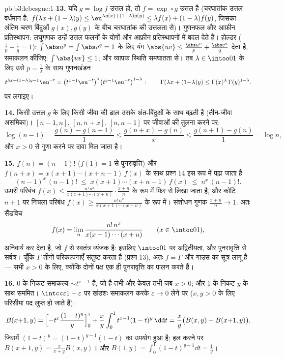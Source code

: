 \begin{solution}{pb:b3:lebesgue:1}
\textbf{13.} यदि $g = \log f$ उत्तल हो, तो $f = \exp\circ g$ उत्तल है (चरघातांक उत्तल
वर्धमान है: $f(\lambda x + (1-\lambda)
y) \leq \eu^{\lambda g(x) + (1-\lambda)g(y)} \leq \lambda f(x)
+ (1-\lambda)f(y)$, जिसका अंतिम चरण बिंदुओं $g(x), g(y)$ के बीच चरघातांक
की उत्तलता से)। गुणनफल और आफ़ीन प्रतिस्थापन: लघुगणक उन्हें उत्तल
फलनों के योगों और आफ़ीन प्रतिस्थापनों में बदल देते हैं। होल्डर ($\frac1p + \frac1q = 1$):
$\int\abs u^p = \int\abs v^q = 1$ के लिए यंग $\abs{uv} \leq
\frac{\abs u^p}p + \frac{\abs v^q}q$ देता है, समाकलन कीजिए: $\int\abs{uv}
\leq 1$; और व्यापक स्थिति
समघातता से। तब $\lambda
\in \intoo01$ के लिए उसे $p = \frac1\lambda$ के साथ गुणनखंडन
\[
t^{\lambda x + (1-\lambda)y - 1}\eu^{-t}
= \bigl(t^{x-1}\eu^{-t}\bigr)^{\lambda}
\bigl(t^{y-1}\eu^{-t}\bigr)^{1-\lambda} :
\qquad
\Gamma(\lambda x + (1{-}\lambda)y) \leq
\Gamma(x)^\lambda\,\Gamma(y)^{1-\lambda} .
\]
पर लगाइए।

\textbf{14.} किसी उत्तल $g$ के लिए किसी जीवा की ढाल उसके अंत-बिंदुओं
के साथ बढ़ती है (तीन-जीवा असमिका)। $[n-1, n]$, $[n, n+x]$, $[n, n+1]$ पर जीवाओं की
तुलना करने पर:
\[
\log(n-1) = \frac{g(n) - g(n-1)}1 \leq
\frac{g(n+x) - g(n)}x \leq \frac{g(n+1) - g(n)}1 = \log n,
\]
और $x > 0$ से गुणा करने पर दावा मिल जाता है।

\textbf{15.} $f(n) = (n-1)!$ ($f(1) = 1$ से पुनरावृत्ति) और $f(n + x) = x(x+1)\cdots(x+n-1)\,f(x)$ के साथ प्रश्न
14 इस रूप में पढ़ा जाता है
\[
(n-1)^x\,(n-1)! \;\leq\; x(x+1)\cdots(x+n-1)\,f(x)
\;\leq\; n^x\,(n-1)! .
\]
ऊपरी परिबंध $f(x) \leq
\frac{n!\,n^x}{x(x+1)\cdots(x+n)}\cdot\frac{x+n}n$ के रूप में फिर से लिखा जाता है, और कोटि $n+1$ पर
निचला परिबंध $f(x) \geq
\frac{n!\,n^x}{x(x+1)\cdots(x+n)}$ के रूप में। संशोधन गुणक $\frac{x+n}n \to 1$: अतः सैंडविच
\[
f(x) = \lim_n\frac{n!\,n^x}{x(x+1)\cdots(x+n)}
\qquad (x \in \intoc01),
\]
अनिवार्य कर देता है, जो $f$ से स्वतंत्र व्यंजक है: इसलिए $\intoc01$
पर अद्वितीयता, और पुनरावृत्ति से सर्वत्र। चूँकि $\Gamma$ तीनों परिकल्पनाएँ
संतुष्ट करता है (प्रश्न 13), अतः $f = \Gamma$ और गाउस का सूत्र लागू है ---
सभी $x > 0$ के लिए, क्योंकि दोनों पक्ष एक ही पुनरावृत्ति का पालन करते
हैं।

\textbf{16.} $0$ के निकट समाकल्य $\sim t^{x-1}$ है, जो  है तभी और
केवल तभी जब $x > 0$; और $1$ के निकट $y$ के साथ सममित। $\intcc\varepsilon{1-\varepsilon}$ पर
खंडशः समाकलन करके $\varepsilon \to 0$ लेने पर ($x, y >
0$ के लिए परिसीमा पद लुप्त हो
जाते हैं):
\[
B(x{+}1, y) = \Bigl[-t^x\frac{(1-t)^y}y\Bigr]_0^1 +
\frac xy\int_0^1t^{x-1}(1-t)^y\,\dd t
= \frac xy\bigl(B(x, y) - B(x{+}1, y)\bigr),
\]
जिसमें $(1-t)^y = (1-t)^{y-1}(1 - t)$ का उपयोग हुआ है; हल करने पर $B(x+1, y) =
\frac{x}{x+y}B(x, y)$। और $B(1, y) =
\int_0^1(1-t)^{y-1}\dd t = \frac1y$।


\end{solution}
